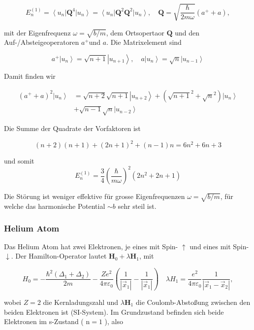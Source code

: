 \documentclass[10pt, letterpaper]{article}
\begin{document}
$$
E_{n}^{(1)}=\left\langle u_{n}\right| \mathbf{Q}^{4}\left|u_{n}\right\rangle=\left\langle u_{n}\right| \mathbf{Q}^{2} \mathbf{Q}^{2}\left|u_{n}\right\rangle, \quad \mathbf{Q}=\sqrt{\frac{\hbar}{2 m \omega}}\left(a^{+}+a\right),
$$

mit der Eigenfrequenz $\omega=\sqrt{b / m}$, dem Ortsopertaor $\mathbf{Q}$ und den Auf-/Absteigeoperatoren $a^{+}$und $a$. Die Matrixelement sind

$$
a^{+}\left|u_{n}\right\rangle=\sqrt{n+1}\left|u_{n+1}\right\rangle, \quad a\left|u_{n}\right\rangle=\sqrt{n}\left|u_{n-1}\right\rangle
$$

Damit finden wir

$$
\begin{aligned}
\left(a^{+}+a\right)^{2}\left|u_{n}\right\rangle & =\sqrt{n+2} \sqrt{n+1}\left|u_{n+2}\right\rangle+\left(\sqrt{n+1}^{2}+\sqrt{n}^{2}\right)\left|u_{n}\right\rangle \\
& +\sqrt{n-1} \sqrt{n}\left|u_{n-2}\right\rangle
\end{aligned}
$$

Die Summe der Quadrate der Vorfaktoren ist

$$
(n+2)(n+1)+(2 n+1)^{2}+(n-1) n=6 n^{2}+6 n+3
$$

und somit
$$
E_{n}^{(1)}=\frac{3}{4}\left(\frac{\hbar}{m \omega}\right)^{2}\left(2 n^{2}+2 n+1\right)
$$

Die Störung ist weniger effektive für grosse Eigenfrequenzen $\omega=\sqrt{b / m}$, für welche das harmonische Potential $\sim b$ sehr steil ist.

\subsubsection*{Helium Atom}
Das Helium Atom hat zwei Elektronen, je eines mit Spin- $\uparrow$ und eines mit Spin- $\downarrow$. Der Hamilton-Operator lautet $\mathbf{H}_{0}+\lambda \mathbf{H}_{1}$, mit

$$
H_{0}=-\frac{\hbar^{2}\left(\Delta_{1}+\Delta_{2}\right)}{2 m}-\frac{Z e^{2}}{4 \pi \varepsilon_{0}}\left(\frac{1}{\left|\vec{x}_{1}\right|}-\frac{1}{\left|\vec{x}_{1}\right|}\right) \quad \lambda H_{1}=\frac{e^{2}}{4 \pi \varepsilon_{0}} \frac{1}{\left|\vec{x}_{1}-\vec{x}_{2}\right|},
$$

wobei $Z=2$ die Kernladungszahl und $\lambda \mathbf{H}_{1}$ die Coulomb-Abstoßung zwischen den beiden Elektronen ist (SI-System). Im Grundzustand befinden sich beide Elektronen im s-Zustand ( $\mathrm{n}=1$ ), also
\end{document}
